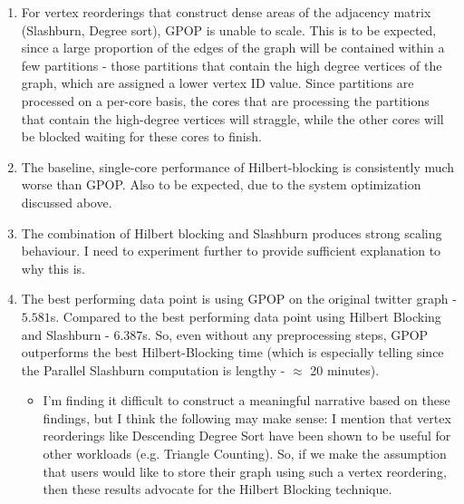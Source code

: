     \begin{enumerate}
        \item For vertex reorderings that construct dense areas of the adjacency matrix (Slashburn, Degree sort), 
        GPOP is unable to scale. This is to be expected, since a large proportion of the edges of the graph will be contained within a few partitions - those partitions that contain the high degree vertices of the graph, which are assigned a lower vertex ID value. Since partitions are processed on a per-core basis, the cores that are processing the partitions that contain the high-degree vertices will straggle, while the other cores will be blocked waiting for these cores to finish.
        \item The baseline, single-core performance of Hilbert-blocking is consistently much worse than GPOP.
        Also to be expected, due to the system optimization discussed above. 
        \item The combination of Hilbert blocking and Slashburn produces strong scaling behaviour. I need to experiment further to provide sufficient explanation to why this is. 
        \item The best performing data point is using GPOP on the original twitter graph - $5.581$s. Compared to the best performing data point using Hilbert Blocking and Slashburn - $6.387$s. So, even without any preprocessing steps, GPOP outperforms the best Hilbert-Blocking time (which is especially telling since the Parallel Slashburn computation is lengthy - $\approx$ 20 minutes).
        \begin{itemize}
            \item I'm finding it difficult to construct a meaningful narrative based on these findings, but I think the following may make sense: I mention that vertex reorderings like Descending Degree Sort have been shown to be useful for other workloads (e.g. Triangle Counting). So, 
            if we make the assumption that users would like to store their graph using such a vertex reordering, then these results advocate for the Hilbert Blocking technique.
        \end{itemize}
    \end{enumerate}